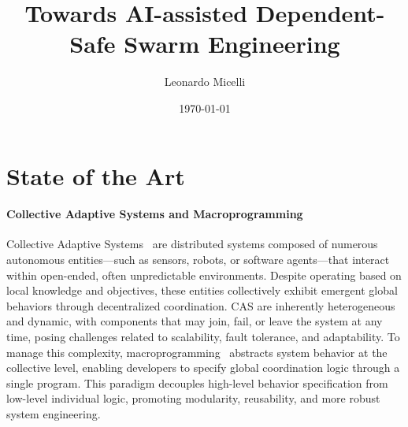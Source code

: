 \documentclass[12pt]{article}
\begin{document}
\title{Towards AI-assisted Dependent-Safe Swarm Engineering}
\author{Leonardo Micelli}
\date{\today}
\maketitle

\noindent


\setcounter{tocdepth}{2}

\setlength{\parindent}{0em}
\setlength{\parskip}{1em}

\section{State of the Art}
\paragraph{\textbf{Collective Adaptive Systems and Macroprogramming}} Collective Adaptive Systems~\cite{ferscha2015collective} are distributed systems composed of numerous autonomous entities—such as sensors, robots, or software agents—that interact within open-ended, often unpredictable environments. 
Despite operating based on local knowledge and objectives, these entities collectively exhibit emergent global behaviors through decentralized coordination. CAS are inherently heterogeneous and dynamic, with components that may join, fail, or leave the system at any time, posing challenges related to scalability, 
fault tolerance, and adaptability. To manage this complexity, macroprogramming~\cite{10.1145/3579353} abstracts system behavior at the collective level, enabling developers to specify global coordination logic through a single program. This paradigm decouples high-level behavior specification from low-level individual logic, promoting modularity, reusability, and more robust system engineering.
\end{document}
